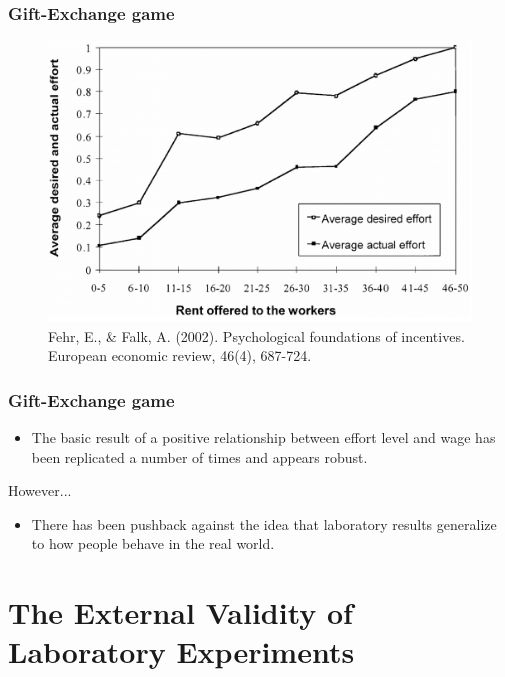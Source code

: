 \documentclass{beamer}
\begin{document}
\begin{frame}
	\frametitle{Gift-Exchange game}

		\begin{center}
		\begin{figure}
			\includegraphics[scale=0.23]{effortwage.png}
			\caption{Fehr, E., \& Falk, A. (2002). Psychological foundations of incentives. European economic review, 46(4), 687-724.}
		\end{figure}
	\end{center}
\end{frame}


\begin{frame}
	\frametitle{Gift-Exchange game}
	
	\begin{itemize}
		\item The basic result of a positive relationship between effort level and wage has been replicated a number of times and appears robust.
	\end{itemize}
	However...
	\begin{itemize}	
		\item There has been pushback against the idea that laboratory results generalize to how people behave in the real world.
	\end{itemize}
	

	
\end{frame}

\section{The External Validity of Laboratory Experiments}

\end{document}
